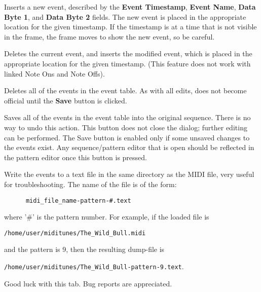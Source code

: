    \setcounter{ItemCounter}{0}      %

   Inserts a new event, described by the 
   \textbf{Event Timestamp},
   \textbf{Event Name},
   \textbf{Data Byte 1}, and
   \textbf{Data Byte 2} fields.
   The new event is placed in the appropriate location for the given timestamp.
   If the timestamp is at a time that is not visible in the frame, the frame
   moves to show the new event, so be careful.

   Deletes the current event, and inserts the modified event,
   which is placed in the appropriate location for the given
   timestamp.  (This feature does not work with linked Note Ons and Note Offs).

   Deletes all of the events in the event table.
   As with all edits, does not become official until the \textbf{Save} button
   is clicked.

   Saves all of the events in the event table into the original sequence.
   There is no way to undo this action.
   This button does not close the dialog; further
   editing can be performed.  The Save button is enabled only if
   some unsaved changes to the events exist.
   Any sequence/pattern editor that is open should be reflected
   in the pattern editor once this button is pressed.

   Write the events to a text file in the same directory as the MIDI file, very
   useful for troubleshooting.  The name of the file is of the form:

   \begin{verbatim}
      midi_file_name-pattern-#.text
   \end{verbatim}

   where '\#' is the pattern number.  For example, if the loaded file is

   \texttt{/home/user/miditunes/The\_Wild\_Bull.midi}

   and the pattern is 9, then the resulting dump-file is

   \texttt{/home/user/miditunes/The\_Wild\_Bull-pattern-9.text}.

   Good luck with this tab.  Bug reports are appreciated.

